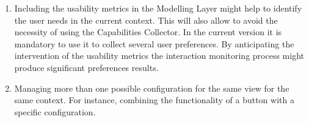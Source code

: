 \begin{enumerate}[label=\alph*)]
  \inputminted[linenos=true, fontsize=\footnotesize, frame=lines]{java}{6_conclusion/api_adaptation.java}

  \item Including the usability metrics in the Modelling Layer might help to
  identify the user needs in the current context. This will also allow to avoid
  the necessity of using the Capabilities Collector. In the current version it
  is mandatory to use it to collect several user preferences. By anticipating
  the intervention of the usability metrics the interaction monitoring process
  might produce significant preferences results.
  
  \item Managing more than one possible configuration for the same view for the 
  same context. For instance, combining the functionality of a button with a 
  specific configuration.
\end{enumerate}